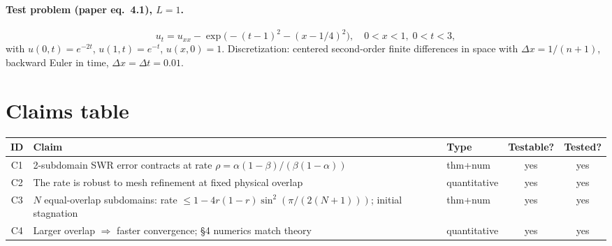 \documentclass[11pt]{article}
\begin{document}
\paragraph{Test problem (paper eq.~4.1), $L=1$.}
\[
u_t = u_{xx} - \exp\!\big(-(t-1)^2 - (x-1/4)^2\big),\quad
0<x<1,\; 0<t<3,
\]
with $u(0,t)=e^{-2t}$, $u(1,t)=e^{-t}$, $u(x,0)=1$.
Discretization: centered second-order finite differences in space with
$\Delta x = 1/(n+1)$, backward Euler in time, $\Delta x = \Delta t = 0.01$.

\section{Claims table}
\begin{tabular}{cllcc}
\toprule
ID & Claim & Type & Testable? & Tested? \\
\midrule
C1 & 2-subdomain SWR error contracts at rate $\rho=\alpha(1-\beta)/(\beta(1-\alpha))$ & thm+num & yes & yes \\
C2 & The rate is robust to mesh refinement at fixed physical overlap & quantitative & yes & yes \\
C3 & $N$ equal-overlap subdomains: rate $\le 1-4r(1-r)\sin^2(\pi/(2(N+1)))$; initial stagnation & thm+num & yes & yes \\
C4 & Larger overlap $\Rightarrow$ faster convergence; \S 4 numerics match theory & quantitative & yes & yes \\
\bottomrule
\end{tabular}
\end{document}
